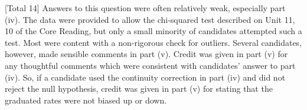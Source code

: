 \documentclass[a4paper,12pt]{article}
\begin{document}
[Total 14]
Answers to this question were often relatively weak, especially part (iv). The
data were provided to allow the chi-squared test described on Unit 11, %
10 of the Core Reading, but only a small minority of candidates attempted
such a test. Most were content with a non-rigorous check for outliers.
Several candidates, however, made sensible comments in part (v). Credit
was given in part (v) for any thoughtful comments which were consistent with
candidates’ answer to part (iv). So, if a candidate used the continuity
correction in part (iv) and did not reject the null hypothesis, credit was given in
part (v) for stating that the graduated rates were not biased up or down.
\end{document}
